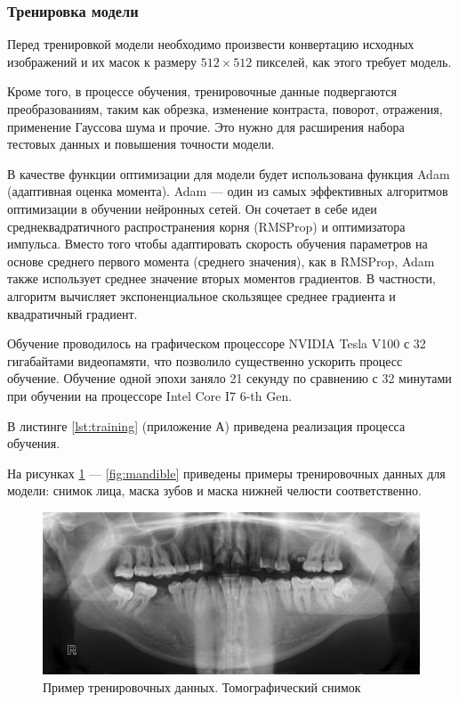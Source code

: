 \subsubsection{Тренировка модели}

Перед тренировкой модели необходимо произвести конвертацию исходных изображений и их масок к размеру $512 \times 512$ пикселей, как этого требует модель.

Кроме того, в процессе обучения, тренировочные данные подвергаются преобразованиям, таким как обрезка, изменение контраста, поворот, отражения, применение Гауссова шума и прочие. Это нужно для расширения набора тестовых данных и повышения точности модели.

В качестве функции оптимизации для модели будет использована функция Adam (адаптивная оценка момента). Adam --- один из самых эффективных алгоритмов оптимизации в обучении нейронных сетей. Он сочетает в себе идеи среднеквадратичного распространения корня (RMSProp) и оптимизатора импульса. Вместо того чтобы адаптировать скорость обучения параметров на основе среднего первого момента (среднего значения), как в RMSProp, Adam также использует среднее значение вторых моментов градиентов. В частности, алгоритм вычисляет экспоненциальное скользящее среднее градиента и квадратичный градиент.

Обучение проводилось на графическом процессоре NVIDIA Tesla V100 с 32 гигабайтами видеопамяти, что позволило существенно ускорить процесс обучение. Обучение одной эпохи заняло 21 секунду по сравнению с 32 минутами при обучении на процессоре Intel Core I7 6-th Gen.

В листинге \ref{lst:training} (приложение А)  приведена реализация процесса обучения.

На рисунках \ref{fig:scan} --- \ref{fig:mandible} приведены примеры тренировочных данных для модели: снимок лица, маска зубов и маска нижней челюсти соответственно.

\begin{figure}[H]
	\centering
	\includegraphics[width=\textwidth]{img/scan.png}
	\caption{Пример тренировочных данных. Томографический снимок}
	\label{fig:scan}
\end{figure}

